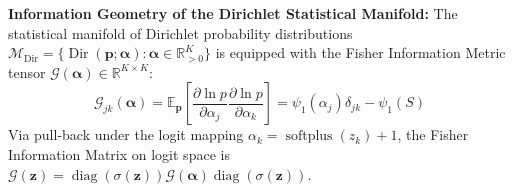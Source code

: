 \documentclass[pdflatex,sn-vancouver-num,referee,lineno]{sn-jnl}
\theoremstyle{thmstyleone}
\theoremstyle{thmstylethree}
\begin{document}
\noindent \textbf{Information Geometry of the Dirichlet Statistical Manifold:} The statistical manifold of Dirichlet probability distributions $\mathcal{M}_{\text{Dir}} = \{\operatorname{Dir}(\mathbf{p}; \boldsymbol{\alpha}) : \boldsymbol{\alpha} \in \mathbb{R}_{>0}^K\}$ is equipped with the Fisher Information Metric tensor $\mathcal{G}(\boldsymbol{\alpha}) \in \mathbb{R}^{K \times K}$:
\begin{equation}
    \mathcal{G}_{jk}(\boldsymbol{\alpha}) = \mathbb{E}_{\mathbf{p}}\left[ \frac{\partial \ln p}{\partial \alpha_j} \frac{\partial \ln p}{\partial \alpha_k} \right] = \psi_1(\alpha_j) \delta_{jk} - \psi_1(S)
\end{equation}
Via pull-back under the logit mapping $\alpha_k = \operatorname{softplus}(z_k) + 1$, the Fisher Information Matrix on logit space is $\mathcal{G}(\mathbf{z}) = \operatorname{diag}(\sigma(\mathbf{z})) \mathcal{G}(\boldsymbol{\alpha}) \operatorname{diag}(\sigma(\mathbf{z}))$.
\end{document}
